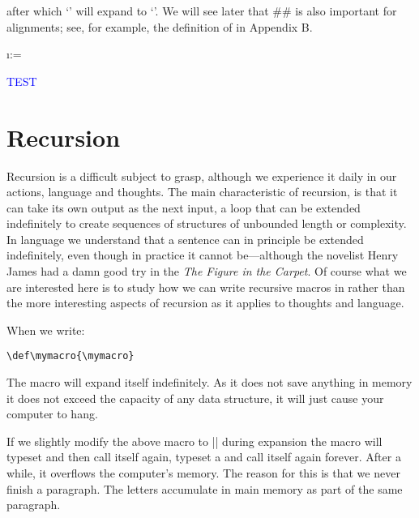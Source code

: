 \begin{teX}
\def\a#1{\def\b##1{##1#1}}
after which `\a!' will expand to `\def\b#1{#1!}'. We will see later that ## is also
important for alignments; see, for example, the definition of \matrix in Appendix B.
\end{teX}

\begin{teX}
\long\def\@for#1:=#2\do#3{%
\expandafter\def\expandafter\@fortmp\expandafter{#2}%
\ifx\@fortmp\@empty \else
\expandafter\@forloop#2 ;\@nil;\@nil\@@#1{#3}\fi}

\long\def\@iforloop#1;#2\@@#3#4{\def#3{#1}\ifx #3\@nnil
\expandafter\@fornoop \else
#4\relax\expandafter\@iforloop\fi#2\@@#3{#4}}


\@for\i:=\mathList\do{%
  \ensuremath \i --  
 }


\meaning\loop 
\def\a#1{\textcolor{blue}{\uppercase{#1}}}
\def\b{test}
\expandafter\a\b

\a\b
\end{teX}


\section{Recursion}
Recursion is a difficult subject to grasp, although we experience it daily in our actions, language and thoughts. 
The main characteristic of recursion, is that it can take its own output as the next input, a loop that can be extended indefinitely to create sequences of structures of unbounded length or complexity. In language we understand that a sentence can in principle be extended indefinitely, even though in practice it cannot be---although the novelist Henry James had a damn good try in the \emph{The Figure in the Carpet}. Of course what we are interested here is to study how we can write recursive macros in \tex rather than the more interesting aspects of recursion as it applies to thoughts and language. 

When we write:

\begin{verbatim}
\def\mymacro{\mymacro}
\end{verbatim}

The macro will expand itself indefinitely. As it does not save anything in memory it does not exceed the capacity of any data structure, it will just cause your computer to hang.

If we slightly modify the above macro to |\def\mymacro{a \mymacro}| during expansion the macro will typeset and then call itself again, typeset a and call itself again forever. After a while, it overflows the computer’s memory. The reason for this is that we never finish a paragraph. The letters accumulate in main memory as part of the same paragraph.



